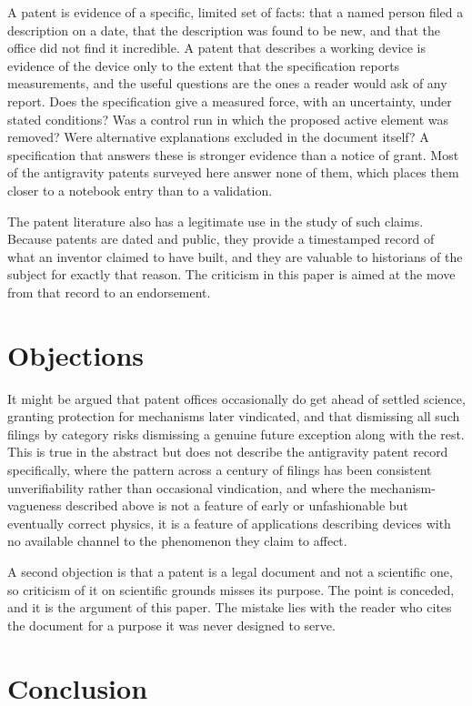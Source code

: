 \documentclass[11pt]{article}
\begin{document}
A patent is evidence of a specific, limited set of facts: that a named person filed a description on a date, that the description was found to be new, and that the office did not find it incredible. A patent that describes a working device is evidence of the device only to the extent that the specification reports measurements, and the useful questions are the ones a reader would ask of any report. Does the specification give a measured force, with an uncertainty, under stated conditions? Was a control run in which the proposed active element was removed? Were alternative explanations excluded in the document itself? A specification that answers these is stronger evidence than a notice of grant. Most of the antigravity patents surveyed here answer none of them, which places them closer to a notebook entry than to a validation.

The patent literature also has a legitimate use in the study of such claims. Because patents are dated and public, they provide a timestamped record of what an inventor claimed to have built, and they are valuable to historians of the subject for exactly that reason. The criticism in this paper is aimed at the move from that record to an endorsement.

\section{Objections}

It might be argued that patent offices occasionally do get ahead of settled science, granting protection for mechanisms later vindicated, and that dismissing all such filings by category risks dismissing a genuine future exception along with the rest. This is true in the abstract but does not describe the antigravity patent record specifically, where the pattern across a century of filings has been consistent unverifiability rather than occasional vindication, and where the mechanism-vagueness described above is not a feature of early or unfashionable but eventually correct physics, it is a feature of applications describing devices with no available channel to the phenomenon they claim to affect.

A second objection is that a patent is a legal document and not a scientific one, so criticism of it on scientific grounds misses its purpose. The point is conceded, and it is the argument of this paper. The mistake lies with the reader who cites the document for a purpose it was never designed to serve.

\section{Conclusion}
\end{document}
